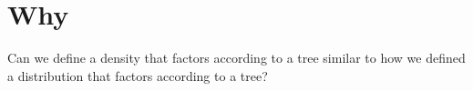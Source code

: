 
\section*{Why}

Can we define a density that factors according to a tree similar to how we defined a distribution that factors according to a tree?
